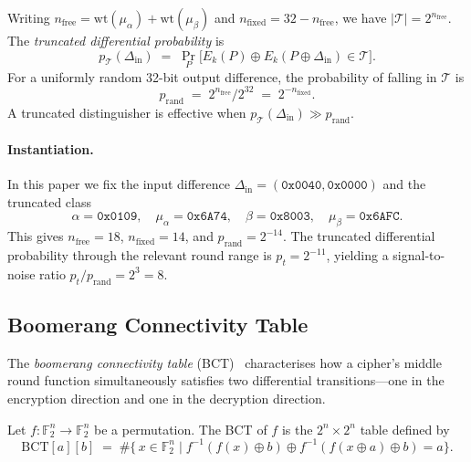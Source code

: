 \documentclass[runningheads]{llncs}
\newcommand{\BCT}{\mathrm{BCT}}
\newcommand{\xor}{\oplus}
\begin{document}
Writing $n_{\mathrm{free}} = \mathrm{wt}(\mu_\alpha) + \mathrm{wt}(\mu_\beta)$
and $n_{\mathrm{fixed}} = 32 - n_{\mathrm{free}}$, we have
$|\mathcal{T}| = 2^{n_{\mathrm{free}}}$.  The \emph{truncated differential
probability} is
\begin{equation}
  p_{\mathcal{T}}(\Delta_{\mathrm{in}}) \;=\;
  \Pr_P\!\bigl[E_k(P) \xor E_k(P \xor \Delta_{\mathrm{in}}) \in \mathcal{T}\bigr].
\end{equation}
For a uniformly random 32-bit output difference, the probability of
falling in $\mathcal{T}$ is
\begin{equation}
  \label{eq:prand}
  p_{\mathrm{rand}} \;=\; 2^{n_{\mathrm{free}}} / 2^{32} \;=\; 2^{-n_{\mathrm{fixed}}}.
\end{equation}
A truncated distinguisher is effective when
$p_{\mathcal{T}}(\Delta_{\mathrm{in}}) \gg p_{\mathrm{rand}}$.

\paragraph{Instantiation.}
In this paper we fix the input difference
$\Delta_{\mathrm{in}} = (\mathtt{0x0040}, \mathtt{0x0000})$ and the
truncated class
\begin{equation}
  \label{eq:our-class}
  \alpha = \mathtt{0x0109},\quad
  \mu_\alpha = \mathtt{0x6A74},\quad
  \beta  = \mathtt{0x8003},\quad
  \mu_\beta  = \mathtt{0x6AFC}.
\end{equation}
This gives $n_{\mathrm{free}} = 18$, $n_{\mathrm{fixed}} = 14$, and
$p_{\mathrm{rand}} = 2^{-14}$.
The truncated differential probability through the relevant round range
is $p_t = 2^{-11}$, yielding a signal-to-noise ratio
$p_t / p_{\mathrm{rand}} = 2^{3} = 8$.

\subsection{Boomerang Connectivity Table}

The \emph{boomerang connectivity table}
(BCT)~\cite{CHPSS18} characterises how a cipher's middle round
function simultaneously satisfies two differential transitions—one in
the encryption direction and one in the decryption direction.

\begin{definition}
  \label{def:bct}
  Let $f : \mathbb{F}_2^n \to \mathbb{F}_2^n$ be a permutation.
  The BCT of $f$ is the $2^n \times 2^n$ table defined by
  \begin{equation}
    \BCT[a][b]
    \;=\;
    \#\!\bigl\{\, x \in \mathbb{F}_2^n \;\big|\;
    f^{-1}(f(x) \xor b) \xor f^{-1}(f(x \xor a) \xor b) = a\bigr\}.
  \end{equation}
\end{definition}
\end{document}
